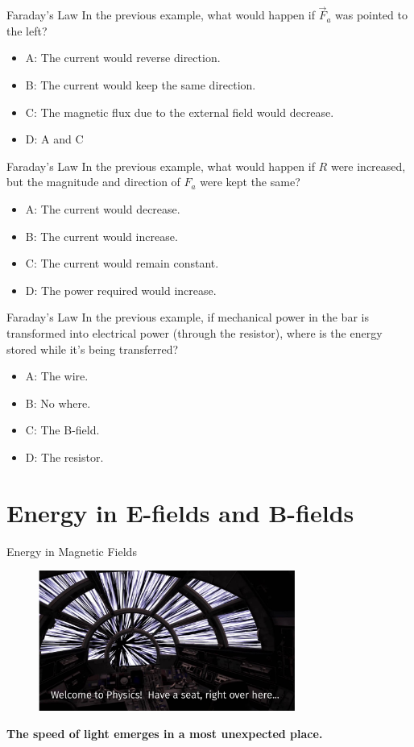 \documentclass{beamer}
\begin{document}
\begin{frame}{Faraday's Law}
In the previous example, what would happen if $\vec{F}_a$ was pointed to the left?
\begin{itemize}
\item A: The current would reverse direction.
\item B: The current would keep the same direction.
\item C: The magnetic flux due to the external field would decrease.
\item D: A and C
\end{itemize}
\end{frame}

\begin{frame}{Faraday's Law}
In the previous example, what would happen if $R$ were increased, but the magnitude and direction of $F_a$ were kept the same?
\begin{itemize}
\item A: The current would decrease.
\item B: The current would increase.
\item C: The current would remain constant.
\item D: The power required would increase.
\end{itemize}
\end{frame}

\begin{frame}{Faraday's Law}
In the previous example, if mechanical power in the bar is transformed into electrical power (through the resistor), where is the energy stored while it's being transferred?
\begin{itemize}
\item A: The wire.
\item B: No where.
\item C: The B-field.
\item D: The resistor.
\end{itemize}
\end{frame}

\section{Energy in E-fields and B-fields}

\begin{frame}{Energy in Magnetic Fields}
\begin{figure}
\center
\includegraphics[width=0.75\textwidth]{figures/hyper.pdf}
\end{figure}
\textbf{The speed of light emerges in a most unexpected place.}
\end{frame}
\end{document}

